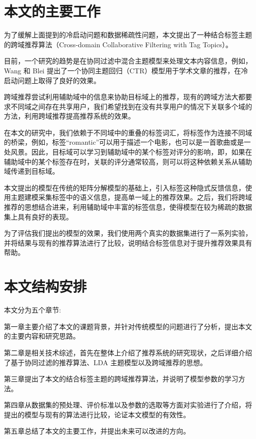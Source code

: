 \section{本文的主要工作}
为了缓解上面提到的冷启动问题和数据稀疏性问题，本文提出了一种结合标签主题的跨域推荐算法（Cross-domain Collaborative Filtering with Tag Topics）。

目前，一个研究的趋势是在协同过滤中混合主题模型来处理文本内容信息，例如，Wang 和 Blei 提出了一个协同主题回归（CTR）\cite{Wang2011Collaborative}模型用于学术文章的推荐，在冷启动问题上取得了良好的效果。

跨域推荐尝试利用辅助域中的信息来协助目标域上的推荐，现有的跨域方法大都要求不同域之间存在共享用户，我们希望找到在没有共享用户的情况下关联多个域的方法，利用跨域推荐提高推荐系统的效果。

在本文的研究中，我们依赖于不同域中的重叠的标签词汇，将标签作为连接不同域的桥梁，例如，标签“romantic”可以用于描述一个电影，也可以是一首歌曲或是一处风景。因此，目标域可以学习到辅助域中的某个标签对评分的影响，即，如果在辅助域中的某个标签存在时，关联的评分通常较高，则可以将这种依赖关系从辅助域传递到目标域。

本文提出的模型在传统的矩阵分解模型的基础上，引入标签这种隐式反馈信息，使用主题建模采集标签中的语义信息，提高单一域上的推荐效果。之后，我们将跨域推荐的思想结合进来，利用辅助域中丰富的标签信息，使得模型在较为稀疏的数据集上具有良好的表现。

为了评估我们提出的模型的效果，我们使用两个真实的数据集进行了一系列实验，并将结果与现有的推荐算法进行了比较，说明结合标签信息对于提升推荐效果具有帮助。


\section{本文结构安排}
本文分为五个章节:

第一章主要介绍了本文的课题背景，并针对传统模型的问题进行了分析，提出本文的主要内容和研究思路。

第二章是相关技术综述，首先在整体上介绍了推荐系统的研究现状，之后详细介绍了基于协同过滤的推荐算法、LDA 主题模型以及跨域推荐的思想。

第三章提出了本文的结合标签主题的跨域推荐算法，并说明了模型参数的学习方法。

第四章从数据集的预处理、评价标准以及参数的选取等方面对实验进行了介绍，将提出的模型与现有的算法进行比较，论证本文模型的有效性。

第五章总结了本文的主要工作，并提出未来可以改进的方向。



